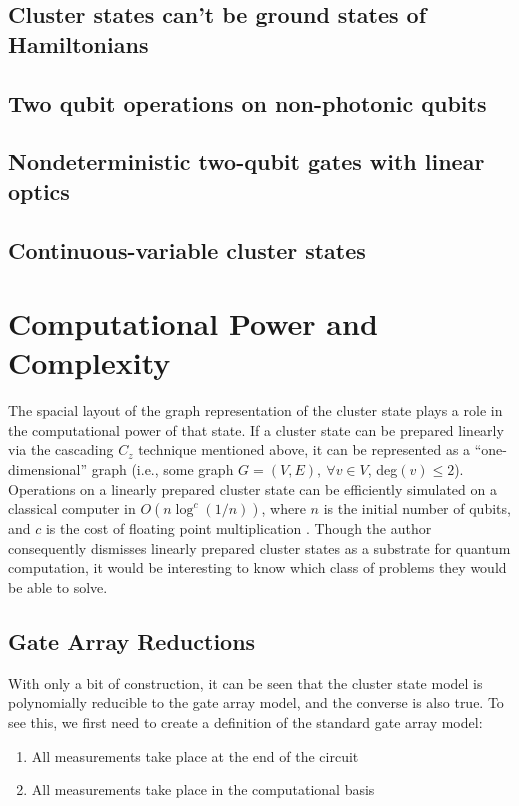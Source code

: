 \documentclass[twocolumn]{Styles/IEEEtran11}
\begin{document}
\subsection{Cluster states can't be ground states of Hamiltonians}

\subsection{Two qubit operations on non-photonic qubits}

\subsection{Nondeterministic two-qubit gates with linear optics}

\subsection{Continuous-variable cluster states}

\section{Computational Power and Complexity}
The spacial layout of the graph representation of the cluster state plays a role in the computational power of that state. If a cluster state can be prepared linearly via the cascading $C_z$ technique mentioned above, it can be represented as a  ``one-dimensional'' graph (i.e., some graph $G=(V,E),\ \forall v\in V$, deg$(v)\leq 2$). Operations on a linearly prepared cluster state can be efficiently simulated on a classical computer in $O(n\log ^c (1/n))$, where $n$ is the initial number of qubits, and $c$ is the cost of floating point multiplication \cite{nielsen2006cluster}. Though the author consequently dismisses linearly prepared cluster states as a substrate for quantum computation, it would be interesting to know which class of problems they would be able to solve.

\subsection{Gate Array Reductions}


With only a bit of construction, it can be seen that the cluster state model is polynomially reducible to the gate array model, and the converse is also true. To see this, we first need to create a definition of the standard gate array model:

\vspace{1em}
\begin{enumerate}
\item All measurements take place at the end of the circuit
\item All measurements take place in the computational basis
\end{enumerate}
\end{document}
